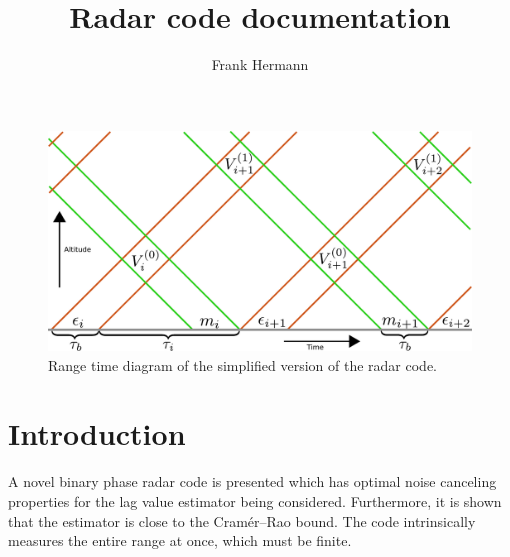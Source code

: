 \documentclass[18pt,a4paper]{extarticle}
\author{Frank Hermann}
\title{Radar code documentation}
\begin{document}
\maketitle
\begin{figure}
	\centering
	\includegraphics[width=1\linewidth]{code_diagram.pdf}
	\caption{Range time diagram of the simplified version of the radar code.}
	\label{fig:sketch}
\end{figure}

\section{Introduction}
A novel binary phase radar code is presented which has optimal noise canceling properties for the lag value estimator being considered.
Furthermore, it is shown that the estimator is close to the Cramér–Rao bound.
The code intrinsically measures the entire range at once, which must be finite.
\end{document}
